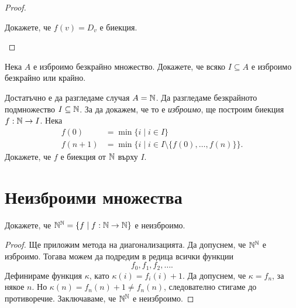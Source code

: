 \begin{proof}
\begin{enumerate}[a)]
    Докажете, че $f(v) = D_v$ е биекция.
  \end{enumerate}
\end{proof}

\begin{problem}
  Нека $A$ е изброимо безкрайно множество.
  Докажете, че всяко $I \subseteq A$ е изброимо безкрайно или крайно.
\end{problem}
\begin{hint}
  Достатъчно е да разгледаме случая $A = \mathbb{N}$.
  Да разгледаме безкрайното подмножество $I \subseteq \mathbb{N}$.
  За да докажем, че то е {\em изброимо}, ще построим биекция $f:\mathbb{N} \to I$.
  Нека
  \begin{align*}
    f(0)   & = \min\{i \mid i \in I\}\\
    f(n+1) &= \min\{i \mid i \in I \setminus\{f(0),\dots,f(n)\}\}.
  \end{align*}
  Докажете, че $f$ е биекция от $\mathbb{N}$ върху $I$.
\end{hint}

\section{Неизброими множества}

\begin{problem}
  Докажете, че $\mathbb{N}^{\mathbb{N}} = \{f \mid f:\mathbb{N} \to \mathbb{N}\}$ е неизброимо.
\end{problem}
\begin{proof}
  Ще приложим метода на диагонализацията. 
  Да допуснем, че $\mathbb{N}^{\mathbb{N}}$ е изброимо.
  Тогава можем да подредим в редица всички функции \[f_0,f_1,f_2,\dots.\]
  Дефинираме функция $\kappa$, като $\kappa(i) = f_i(i)+1$.
  Да допуснем, че $\kappa = f_n$, за някое $n$.
  Но $\kappa(n) = f_n(n)+1 \neq f_n(n)$, следователно стигаме до противоречие.
  Заключаваме, че $\mathbb{N}^{\mathbb{N}}$ е неизброимо.
\end{proof}

